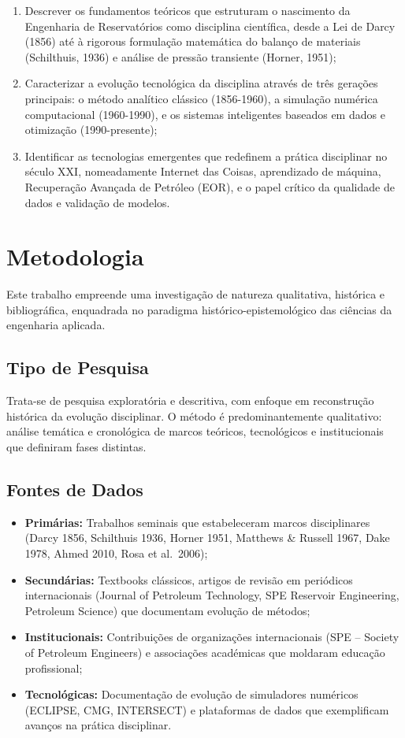 \documentclass[12pt,a4paper,oneside,brazilian,sumario=tradicional]{abntex2}
\begin{document}
\begin{enumerate}[label=\alph*)]
  \item Descrever os fundamentos teóricos que estruturam o nascimento da Engenharia de Reservatórios como disciplina científica, desde a Lei de Darcy (1856) até à rigorous formulação matemática do balanço de materiais (Schilthuis, 1936) e análise de pressão transiente (Horner, 1951);
  \item Caracterizar a evolução tecnológica da disciplina através de três gerações principais: o método analítico clássico (1856-1960), a simulação numérica computacional (1960-1990), e os sistemas inteligentes baseados em dados e otimização (1990-presente);
  \item Identificar as tecnologias emergentes que redefinem a prática disciplinar no século XXI, nomeadamente Internet das Coisas, aprendizado de máquina, Recuperação Avançada de Petróleo (EOR), e o papel crítico da qualidade de dados e validação de modelos.
\end{enumerate}

\chapter{Metodologia}

Este trabalho empreende uma investigação de natureza qualitativa, histórica e bibliográfica, enquadrada no paradigma histórico-epistemológico das ciências da engenharia aplicada.

\section{Tipo de Pesquisa}

Trata-se de pesquisa exploratória e descritiva, com enfoque em reconstrução histórica da evolução disciplinar. O método é predominantemente qualitativo: análise temática e cronológica de marcos teóricos, tecnológicos e institucionais que definiram fases distintas.

\section{Fontes de Dados}

\begin{itemize}
  \item \textbf{Primárias:} Trabalhos seminais que estabeleceram marcos disciplinares (Darcy 1856, Schilthuis 1936, Horner 1951, Matthews \& Russell 1967, Dake 1978, Ahmed 2010, Rosa et al.~2006);
  \item \textbf{Secundárias:} Textbooks clássicos, artigos de revisão em periódicos internacionais (Journal of Petroleum Technology, SPE Reservoir Engineering, Petroleum Science) que documentam evolução de métodos;
  \item \textbf{Institucionais:} Contribuições de organizações internacionais (SPE -- Society of Petroleum Engineers) e associações académicas que moldaram educação profissional;
  \item \textbf{Tecnológicas:} Documentação de evolução de simuladores numéricos (ECLIPSE, CMG, INTERSECT) e plataformas de dados que exemplificam avanços na prática disciplinar.
\end{itemize}
\end{document}
